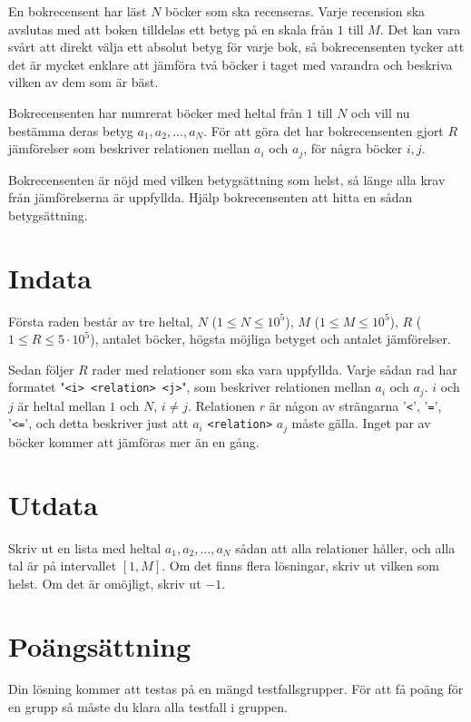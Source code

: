 En bokrecensent har läst $N$ böcker som ska recenseras. Varje recension ska
avslutas med att boken tilldelas ett betyg på en skala från $1$ till $M$. Det kan
vara svårt att direkt välja ett absolut betyg för varje bok, så
bokrecensenten tycker att det är mycket enklare att jämföra två böcker i
taget med varandra och beskriva vilken av dem som är bäst.

Bokrecensenten har numrerat böcker med heltal från $1$ till $N$ och vill nu
bestämma deras betyg $a_1, a_2, \dots , a_N$. För att göra det har
bokrecensenten gjort $R$ jämförelser som beskriver relationen mellan $a_i$ och
$a_j$, för några böcker $i, j$.

Bokrecensenten är nöjd med vilken betygsättning som helst, så länge alla krav
från jämförelserna är uppfyllda. Hjälp bokrecensenten att hitta en sådan
betygsättning.

\section*{Indata}

Första raden består av tre heltal, $N$ ($1 \leq N \leq 10^5$), 
$M$ ($1 \leq M \leq 10^5$),
$R$ ($1 \leq R \leq 5 \cdot 10^5$), antalet böcker, högsta möjliga
betyget och antalet jämförelser.

Sedan följer $R$ rader med relationer som ska
vara uppfyllda. Varje sådan rad har formatet "\texttt{<i> <relation> <j>}",
som beskriver relationen mellan $a_i$ och $a_j$. $i$ och $j$ är heltal mellan
$1$ och $N$, $i \neq j$. Relationen $r$ är någon av strängarna '\texttt{<}', '\texttt{=}',
'\texttt{<=}', och detta beskriver just att $a_i$ \texttt{<relation>} $a_j$ måste gälla.
Inget par av böcker kommer att jämföras mer än en gång.

\section*{Utdata}

Skriv ut en lista med heltal $a_1, a_2, \ldots , a_N$ sådan att alla relationer håller, och
alla tal är på intervallet $[1, M]$. Om det finns flera lösningar, skriv ut vilken som helst.
Om det är omöjligt, skriv ut $-1$.

\section*{Poängsättning}
Din lösning kommer att testas på en mängd testfallsgrupper.
För att få poäng för en grupp så måste du klara alla testfall i gruppen.


